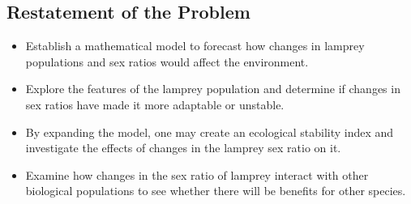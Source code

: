\documentclass[12pt]{article}  %
\begin{document}
\subsection{Restatement of the Problem}

\begin{itemize}
	\setlength{\parsep}{0ex} %
	\setlength{\topsep}{2ex} %
	\setlength{\itemsep}{1ex} %
	\item %
	Establish a mathematical model to forecast how changes in lamprey populations and sex ratios would affect the environment.
	\item %
	Explore the features of the lamprey population and determine if changes in sex ratios have made it more adaptable or unstable.
	\item %
	By expanding the model, one may create an ecological stability index and investigate the effects of changes in the lamprey sex ratio on it.
	\item %
	Examine how changes in the sex ratio of lamprey interact with other biological populations to see whether there will be benefits for other species.
\end{itemize}
\end{document}
